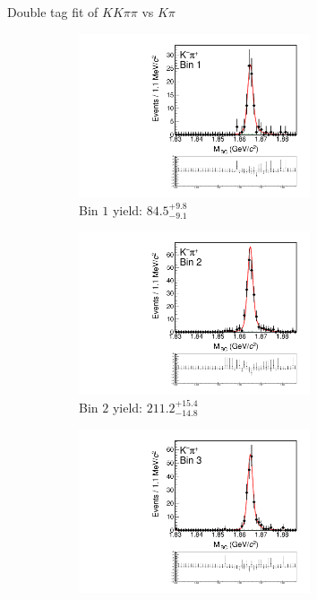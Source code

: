 \documentclass{beamer}
\begin{document}
\begin{frame}{Double tag fit of $KK\pi\pi$ vs $K\pi$}
  \begin{figure}
    \centering
    \begin{subfigure}{0.5\textwidth}
      \centering
      \includegraphics[width=0.75\textwidth,trim={0 5cm 0 0},clip=true]{Plots/DoubleTagYield_DoubleTag_Flavour_KKpipi_vs_Kpi_SignalBinP1_TagBin0.pdf}
      \caption{Bin $1$ yield: $84.5_{-9.1}^{+9.8}$}
    \end{subfigure}%
    \begin{subfigure}{0.5\textwidth}
      \centering
      \includegraphics[width=0.75\textwidth,trim={0 5cm 0 0},clip=true]{Plots/DoubleTagYield_DoubleTag_Flavour_KKpipi_vs_Kpi_SignalBinP2_TagBin0.pdf}
      \caption{Bin $2$ yield: $211.2_{-14.8}^{+15.4}$}
    \end{subfigure}
    \begin{subfigure}{0.5\textwidth}
      \centering
      \includegraphics[width=0.75\textwidth,trim={0 5cm 0 0},clip=true]{Plots/DoubleTagYield_DoubleTag_Flavour_KKpipi_vs_Kpi_SignalBinP3_TagBin0.pdf}

\end{subfigure}
\end{figure}
\end{frame}
\end{document}
